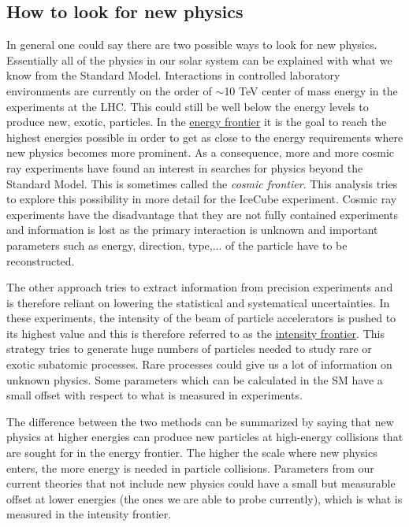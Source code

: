 \subsection{How to look for new physics}
In general one could say there are two possible ways to look for new physics. Essentially all of the physics in our solar system can be explained with what we know from the Standard Model. Interactions in controlled laboratory environments are currently on the order of $\sim$10 TeV center of mass energy in the experiments at the LHC. This could still be well below the energy levels to produce new, exotic, particles. In the \underline{energy frontier} it is the goal to reach the highest energies possible in order to get as close to the energy requirements where new physics becomes more prominent. As a consequence, more and more cosmic ray experiments have found an interest in searches for physics beyond the Standard Model. This is sometimes called the \textit{cosmic frontier}. This analysis tries to explore this possibility in more detail for the IceCube experiment. Cosmic ray experiments have the disadvantage that they are not fully contained experiments and information is lost as the primary interaction is unknown and important parameters such as energy, direction, type,... of the particle have to be reconstructed.

The other approach tries to extract information from precision experiments and is therefore reliant on lowering the statistical and systematical uncertainties. In these experiments, the intensity of the beam of particle accelerators is pushed to its highest value and this is therefore referred to as the \underline{intensity frontier}. This strategy tries to generate huge numbers of particles needed to study rare or exotic subatomic processes. Rare processes could give us a lot of information on unknown physics. Some parameters which can be calculated in the SM have a small offset with respect to what is measured in experiments.

The difference between the two methods can be summarized by saying that new physics at higher energies can produce new particles at high-energy collisions that are sought for in the energy frontier. The higher the scale where new physics enters, the more energy is needed in particle collisions. Parameters from our current theories that not include new physics could have a small but measurable offset at lower energies (the ones we are able to probe currently), which is what is measured in the intensity frontier. \\


